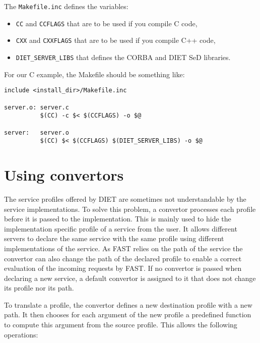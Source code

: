 {{The \texttt{Makefile.inc} defines the variables:
\begin{itemize}
\item \texttt{CC} and \texttt{CCFLAGS} that are to be used if you compile C
 code,
\item \texttt{CXX} and \texttt{CXXFLAGS} that are to be used if you compile C++
  code,
\item \texttt{DIET\_SERVER\_LIBS} that defines the CORBA and DIET SeD libraries.
\end{itemize}

For our C example, the Makefile should be something like:
{\footnotesize
\begin{verbatim}
include <install_dir>/Makefile.inc

server.o: server.c
          $(CC) -c $< $(CCFLAGS) -o $@

server:   server.o
          $(CC) $< $(CCFLAGS) $(DIET_SERVER_LIBS) -o $@
\end{verbatim}
}

\section{Using convertors}

The service profiles offered by DIET are sometimes not
understandable by the service implementations. To solve this problem,
a convertor processes each profile before it is passed to the
implementation. This is mainly used to
hide the implementation specific profile of a service from
the user. It allows different servers to declare the same
service with the same profile using different implementations
of the service. As FAST relies on the path of the service the
convertor can also change the path of the declared profile to
enable a correct evaluation of the incoming requests by FAST.
If no convertor is passed when declaring a new service, a
default convertor is assigned to it that does not change its
profile nor its path.

To translate a profile, the convertor defines a new
destination profile with a new path. It then chooses for
each argument of the new profile a predefined function
to compute this argument from the source profile. This
allows the following operations:

}}
